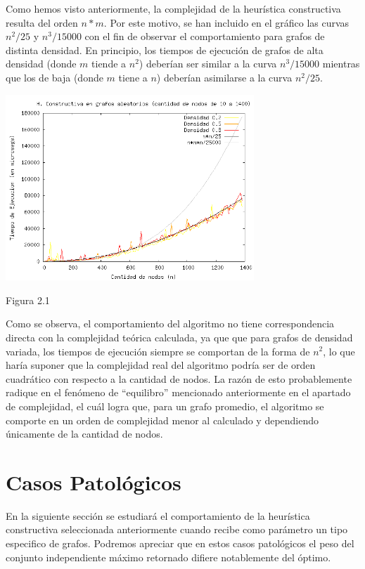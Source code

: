 \documentclass[a4paper,11pt] {article}
\begin{document}
Como hemos visto anteriormente, la complejidad de la heurística constructiva resulta del orden $n*m$. Por este motivo, se han incluido en el gráfico las curvas $n^2/25$ y $n^3/15000$ con el fin de observar el comportamiento para grafos de distinta densidad. En principio, los tiempos de ejecución de grafos de alta densidad (donde $m$ tiende a $n^2$) deberían ser similar a la curva $n^3/15000$ mientras que los de baja (donde $m$ tiene a $n$) deberían asimilarse a la curva $n^2/25$.

\begin{center}
 \includegraphics[width=0.7\textwidth]{graficos/tiemposHC.png}
\begin{center}
Figura 2.1
\end{center}
\end{center}

Como se observa, el comportamiento del algoritmo no tiene correspondencia directa con la complejidad teórica calculada, ya que que para grafos de densidad variada, los tiempos de ejecución siempre se comportan de la forma de $n^2$, lo que haría suponer que la complejidad real del algoritmo podría ser de orden cuadrático con respecto a la cantidad de nodos. La razón de esto probablemente radique en el fenómeno de ``equilibro'' mencionado anteriormente en el apartado de complejidad, el cuál logra que, para un grafo promedio, el algoritmo se comporte en un orden de complejidad menor al calculado y dependiendo únicamente de la cantidad de nodos.

\section*{Casos Patol\'ogicos}

En la siguiente secci\'on se estudiar\'a el comportamiento de la heur\'istica constructiva seleccionada anteriormente cuando recibe como par\'ametro un tipo especifico de grafos. Podremos apreciar que en estos casos patol\'ogicos el peso del conjunto independiente m\'aximo retornado difiere notablemente del \'optimo.
\end{document}
